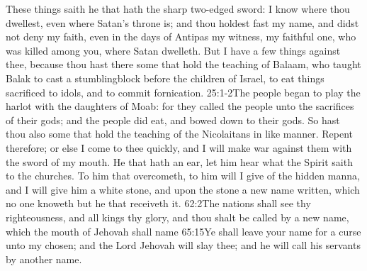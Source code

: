 These things saith he that hath the sharp two-edged sword:%
I know where thou dwellest,%
 even where Satan’s throne is; and thou holdest fast my name, and didst not deny my faith, even in the days of Antipas my witness, my faithful one, who was killed among you, where Satan dwelleth. %
But I have a few things against thee, because thou hast there some that hold the teaching of Balaam, who taught Balak to cast a stumblingblock before the children of Israel, to eat things sacrificed to idols, and to commit fornication.%
								{25:1-2}{The people began to play the harlot with the daughters of Moab: for they called the people unto the sacrifices of their gods; and the people did eat, and bowed down to their gods.} %
So hast thou also some that hold the teaching of the Nicolaitans in like manner. %
Repent therefore; or else I come to thee quickly, and I will make war against them with the sword of my mouth.%
He that hath an ear, let him hear what the Spirit saith to the churches. To him that overcometh, to him will I give of the hidden manna,%
and I will give him a white stone, and upon the stone a new name written, which no one knoweth but he that receiveth it.%
					{62:2}{The nations shall see thy righteousness, and all kings thy glory, and thou shalt be called by a new name, which the mouth of Jehovah shall name}
					{65:15}{Ye shall leave your name for a curse unto my chosen; and the Lord Jehovah will slay thee; and he will call his servants by another name.}
